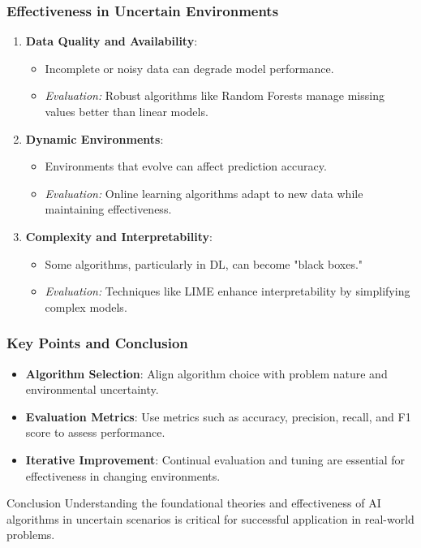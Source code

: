 \documentclass[aspectratio=169]{beamer}
\begin{document}
\begin{frame}
    \frametitle{Effectiveness in Uncertain Environments}
    \begin{enumerate}
        \item \textbf{Data Quality and Availability}:
            \begin{itemize}
                \item Incomplete or noisy data can degrade model performance.
                \item \textit{Evaluation:} Robust algorithms like Random Forests manage missing values better than linear models.
            \end{itemize}
        
        \item \textbf{Dynamic Environments}:
            \begin{itemize}
                \item Environments that evolve can affect prediction accuracy.
                \item \textit{Evaluation:} Online learning algorithms adapt to new data while maintaining effectiveness.
            \end{itemize}
        
        \item \textbf{Complexity and Interpretability}:
            \begin{itemize}
                \item Some algorithms, particularly in DL, can become "black boxes."
                \item \textit{Evaluation:} Techniques like LIME enhance interpretability by simplifying complex models.
            \end{itemize}
    \end{enumerate}
\end{frame}

\begin{frame}[fragile]
    \frametitle{Key Points and Conclusion}
    \begin{itemize}
        \item \textbf{Algorithm Selection}: Align algorithm choice with problem nature and environmental uncertainty.
        \item \textbf{Evaluation Metrics}: Use metrics such as accuracy, precision, recall, and F1 score to assess performance.
        \item \textbf{Iterative Improvement}: Continual evaluation and tuning are essential for effectiveness in changing environments.
    \end{itemize}
    \begin{block}{Conclusion}
        Understanding the foundational theories and effectiveness of AI algorithms in uncertain scenarios is critical for successful application in real-world problems.
    \end{block}
\end{frame}
\end{document}
